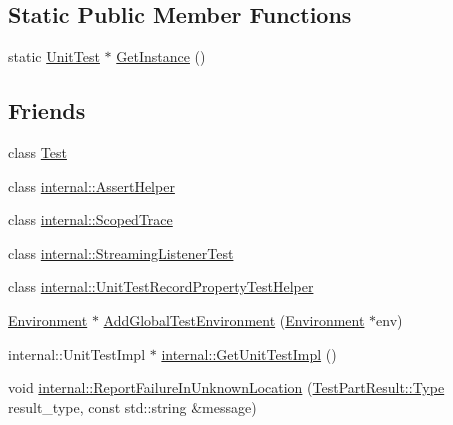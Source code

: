 \subsection*{Static Public Member Functions}
\begin{DoxyCompactItemize}
\item 
static \hyperlink{classtesting_1_1_unit_test}{Unit\+Test} $\ast$ \hyperlink{classtesting_1_1_unit_test_af254e2e695471eb9f128bc556bae3668}{Get\+Instance} ()
\end{DoxyCompactItemize}
\subsection*{Friends}
\begin{DoxyCompactItemize}
\item 
class \hyperlink{classtesting_1_1_unit_test_a5b78b1c2e1fa07ffed92da365593eaa4}{Test}
\item 
class \hyperlink{classtesting_1_1_unit_test_a183151aa061362c87572e743fe233db1}{internal\+::\+Assert\+Helper}
\item 
class \hyperlink{classtesting_1_1_unit_test_afa3927576c08d7b1e197ba16b2b3dcb7}{internal\+::\+Scoped\+Trace}
\item 
class \hyperlink{classtesting_1_1_unit_test_adc037d188dab349a94868991955c9cd4}{internal\+::\+Streaming\+Listener\+Test}
\item 
class \hyperlink{classtesting_1_1_unit_test_ae970f89a9f477a349fe5778be85ef42e}{internal\+::\+Unit\+Test\+Record\+Property\+Test\+Helper}
\item 
\hyperlink{classtesting_1_1_environment}{Environment} $\ast$ \hyperlink{classtesting_1_1_unit_test_a5ec26e4c31220ff8e769cc09689a4d6d}{Add\+Global\+Test\+Environment} (\hyperlink{classtesting_1_1_environment}{Environment} $\ast$env)
\item 
internal\+::\+Unit\+Test\+Impl $\ast$ \hyperlink{classtesting_1_1_unit_test_a56e56be7066957d612e53b5c60f6ac08}{internal\+::\+Get\+Unit\+Test\+Impl} ()
\item 
void \hyperlink{classtesting_1_1_unit_test_a73f5a158c13793b90c80d854c9a75120}{internal\+::\+Report\+Failure\+In\+Unknown\+Location} (\hyperlink{classtesting_1_1_test_part_result_a65ae656b33fdfdfffaf34858778a52d5}{Test\+Part\+Result\+::\+Type} result\+\_\+type, const std\+::string \&message)
\end{DoxyCompactItemize}


